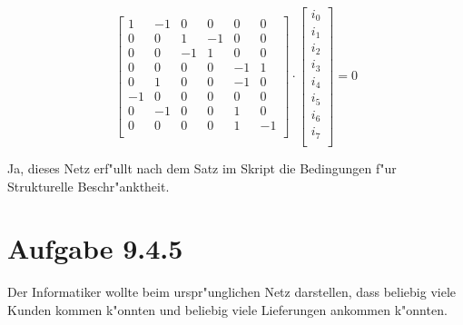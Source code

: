 \documentclass{article}
\begin{document}
\[
\begin{bmatrix}
1   &	-1  &	0   &	0   &	0   &	0 \\
0   &	0   &	1   &	-1  &	0   &	0 \\
0   &	0   &	-1  &	1   &	0   &	0 \\
0   &	0   &	0   &	0   &	-1  &	1 \\
0   &	1   &	0   &	0   &	-1  &	0 \\
-1  &	0   &	0   &	0   &	0   &	0 \\
0   &	-1  &	0   &	0   &	1   &   0 \\
0   &	0   &	0   &	0   &	1   &   -1\\
\end{bmatrix}
\cdot
\begin{bmatrix}
i_0  \\
i_1  \\
i_2  \\
i_3  \\
i_4  \\
i_5  \\
i_6  \\
i_7  \\
\end{bmatrix}
= 0
\]

Ja, dieses Netz erf"ullt nach dem Satz im Skript die Bedingungen f"ur
Strukturelle Beschr"anktheit.

\section*{Aufgabe 9.4.5}
Der Informatiker wollte beim urspr"unglichen Netz darstellen, dass beliebig
viele Kunden kommen k"onnten und beliebig viele Lieferungen ankommen k"onnten. 
\end{document}

